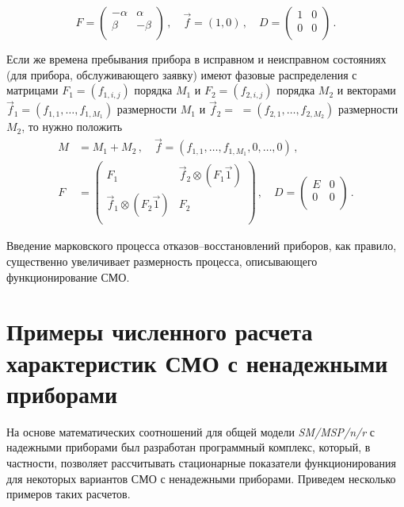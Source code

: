 \begin{multicols}{2}
\noindent
$$
F =
\begin{pmatrix}
-\alpha   &   \alpha \\
\beta     &   -\beta \\
\end{pmatrix}\,,\quad
\vec f = (1,0)\,,\quad D =
\begin{pmatrix}
1   &   0 \\
0   &   0 \\
\end{pmatrix}\,.
$$

Если же времена пребывания прибора в исправном и неисправном состояниях (для 
прибора, обслуживающего заявку) имеют фазовые распределения с матрицами 
$F_1=(f_{1,i,j})$ порядка $M_1$ и $F_2=(f_{2,i,j})$ порядка $M_2$ и векторами 
$\vec f_1=(f_{1,1},\ldots,f_{1,M_1})$ размерности $M_1$ и $\vec f_2=$ 
$=(f_{2,1},\ldots,f_{2,M_2})$ размерности $M_2$, то нужно положить
\begin{align*} %
M &=M_1+M_2\,,\quad
\vec f = (f_{1,1},\ldots,f_{1,M_1},0,\ldots, 0)\,,\\
F &=
\begin{pmatrix}
F_1                             &   \vec f_2 \otimes (F_1 \vec1)     \\
\vec f_1 \otimes (F_2 \vec1)  &     F_2                              \\
\end{pmatrix}\,,\quad
D =
\begin{pmatrix}
E   &   0 \\
0   &   0 \\
\end{pmatrix}\,.
\end{align*} %

Введение марковского процесса отказов--восстановлений приборов, как
правило, существенно увеличивает размерность процесса, описы\-ва\-юще\-го
функционирование СМО.

\section{Примеры численного расчета
характеристик СМО с ненадежными приборами}

На основе математических соотношений для общей модели {\it SM/MSP/n/r}
с надежными приборами был разработан программный комплекс,
который, в частности, позволяет рассчитывать стационарные показатели
функционирования для некоторых вариантов СМО с ненадежными приборами.
Приведем несколько примеров таких расчетов.


\end{multicols}

